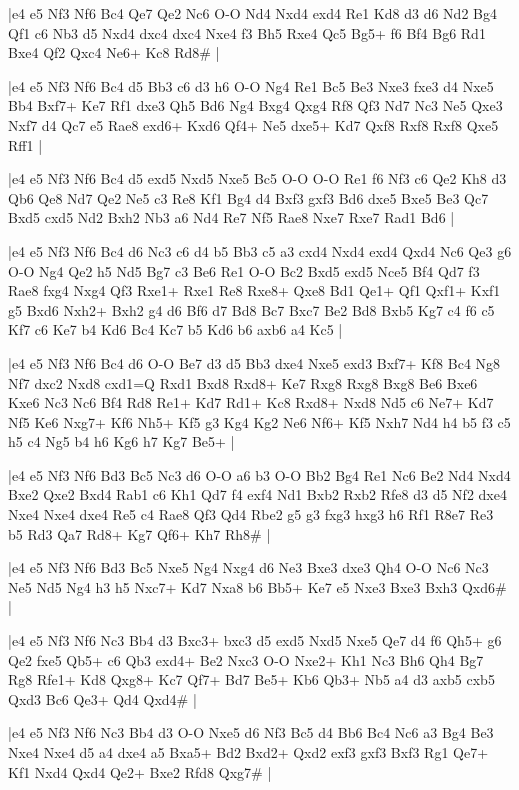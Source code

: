 \whitename{}
\blackname{}
\makegametitle
|e4 e5 Nf3 Nf6 Bc4 Qe7 Qe2 Nc6 O-O Nd4 Nxd4 exd4 Re1 Kd8 d3 d6 Nd2 Bg4 Qf1 c6 Nb3 d5 Nxd4 dxc4 dxc4 Nxe4 f3 Bh5 Rxe4 Qc5 Bg5+ f6 Bf4 Bg6 Rd1 Bxe4 Qf2 Qxc4 Ne6+ Kc8 Rd8\#  |

\whitename{}
\blackname{}
\makegametitle
|e4 e5 Nf3 Nf6 Bc4 d5 Bb3 c6 d3 h6 O-O Ng4 Re1 Bc5 Be3 Nxe3 fxe3 d4 Nxe5 Bb4 Bxf7+ Ke7 Rf1 dxe3 Qh5 Bd6 Ng4 Bxg4 Qxg4 Rf8 Qf3 Nd7 Nc3 Ne5 Qxe3 Nxf7 d4 Qc7 e5 Rae8 exd6+ Kxd6 Qf4+ Ne5 dxe5+ Kd7 Qxf8 Rxf8 Rxf8 Qxe5 Rff1  |

\whitename{}
\blackname{}
\makegametitle
|e4 e5 Nf3 Nf6 Bc4 d5 exd5 Nxd5 Nxe5 Bc5 O-O O-O Re1 f6 Nf3 c6 Qe2 Kh8 d3 Qb6 Qe8 Nd7 Qe2 Ne5 c3 Re8 Kf1 Bg4 d4 Bxf3 gxf3 Bd6 dxe5 Bxe5 Be3 Qc7 Bxd5 cxd5 Nd2 Bxh2 Nb3 a6 Nd4 Re7 Nf5 Rae8 Nxe7 Rxe7 Rad1 Bd6  |

\whitename{}
\blackname{}
\makegametitle
|e4 e5 Nf3 Nf6 Bc4 d6 Nc3 c6 d4 b5 Bb3 c5 a3 cxd4 Nxd4 exd4 Qxd4 Nc6 Qe3 g6 O-O Ng4 Qe2 h5 Nd5 Bg7 c3 Be6 Re1 O-O Bc2 Bxd5 exd5 Nce5 Bf4 Qd7 f3 Rae8 fxg4 Nxg4 Qf3 Rxe1+ Rxe1 Re8 Rxe8+ Qxe8 Bd1 Qe1+ Qf1 Qxf1+ Kxf1 g5 Bxd6 Nxh2+ Bxh2 g4 d6 Bf6 d7 Bd8 Bc7 Bxc7 Be2 Bd8 Bxb5 Kg7 c4 f6 c5 Kf7 c6 Ke7 b4 Kd6 Bc4 Kc7 b5 Kd6 b6 axb6 a4 Kc5  |

\whitename{}
\blackname{}
\makegametitle
|e4 e5 Nf3 Nf6 Bc4 d6 O-O Be7 d3 d5 Bb3 dxe4 Nxe5 exd3 Bxf7+ Kf8 Bc4 Ng8 Nf7 dxc2 Nxd8 cxd1=Q Rxd1 Bxd8 Rxd8+ Ke7 Rxg8 Rxg8 Bxg8 Be6 Bxe6 Kxe6 Nc3 Nc6 Bf4 Rd8 Re1+ Kd7 Rd1+ Kc8 Rxd8+ Nxd8 Nd5 c6 Ne7+ Kd7 Nf5 Ke6 Nxg7+ Kf6 Nh5+ Kf5 g3 Kg4 Kg2 Ne6 Nf6+ Kf5 Nxh7 Nd4 h4 b5 f3 c5 h5 c4 Ng5 b4 h6 Kg6 h7 Kg7 Be5+  |

\whitename{}
\blackname{}
\makegametitle
|e4 e5 Nf3 Nf6 Bd3 Bc5 Nc3 d6 O-O a6 b3 O-O Bb2 Bg4 Re1 Nc6 Be2 Nd4 Nxd4 Bxe2 Qxe2 Bxd4 Rab1 c6 Kh1 Qd7 f4 exf4 Nd1 Bxb2 Rxb2 Rfe8 d3 d5 Nf2 dxe4 Nxe4 Nxe4 dxe4 Re5 c4 Rae8 Qf3 Qd4 Rbe2 g5 g3 fxg3 hxg3 h6 Rf1 R8e7 Re3 b5 Rd3 Qa7 Rd8+ Kg7 Qf6+ Kh7 Rh8\#  |

\whitename{}
\blackname{}
\makegametitle
|e4 e5 Nf3 Nf6 Bd3 Bc5 Nxe5 Ng4 Nxg4 d6 Ne3 Bxe3 dxe3 Qh4 O-O Nc6 Nc3 Ne5 Nd5 Ng4 h3 h5 Nxc7+ Kd7 Nxa8 b6 Bb5+ Ke7 e5 Nxe3 Bxe3 Bxh3 Qxd6\#  |

\whitename{}
\blackname{}
\makegametitle
|e4 e5 Nf3 Nf6 Nc3 Bb4 d3 Bxc3+ bxc3 d5 exd5 Nxd5 Nxe5 Qe7 d4 f6 Qh5+ g6 Qe2 fxe5 Qb5+ c6 Qb3 exd4+ Be2 Nxc3 O-O Nxe2+ Kh1 Nc3 Bh6 Qh4 Bg7 Rg8 Rfe1+ Kd8 Qxg8+ Kc7 Qf7+ Bd7 Be5+ Kb6 Qb3+ Nb5 a4 d3 axb5 cxb5 Qxd3 Bc6 Qe3+ Qd4 Qxd4\#  |

\whitename{}
\blackname{}
\makegametitle
|e4 e5 Nf3 Nf6 Nc3 Bb4 d3 O-O Nxe5 d6 Nf3 Bc5 d4 Bb6 Bc4 Nc6 a3 Bg4 Be3 Nxe4 Nxe4 d5 a4 dxe4 a5 Bxa5+ Bd2 Bxd2+ Qxd2 exf3 gxf3 Bxf3 Rg1 Qe7+ Kf1 Nxd4 Qxd4 Qe2+ Bxe2 Rfd8 Qxg7\#  |


